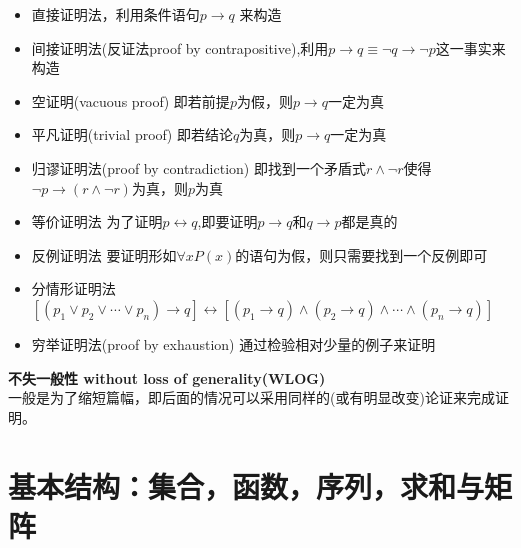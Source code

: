 \documentclass{article}
\begin{document}
    \begin{itemize}
        \item 直接证明法，利用条件语句$p\rightarrow q$ 来构造
        \item 间接证明法(反证法proof by contrapositive),利用$p\rightarrow q \equiv \neg q \rightarrow \neg p$这一事实来构造
        \item 空证明(vacuous proof) 即若前提$p$为假，则$p\rightarrow q$一定为真
        \item 平凡证明(trivial proof) 即若结论$q$为真，则$p\rightarrow q$一定为真
        \item 归谬证明法(proof by contradiction) 即找到一个矛盾式$r\wedge \neg r$使得$\neg p \rightarrow (r \wedge \neg r)$为真，则$p$为真
        \item 等价证明法 为了证明$p\leftrightarrow q$,即要证明$p\rightarrow q$和$q\rightarrow p$都是真的
        \item 反例证明法 要证明形如$\forall xP(x)$的语句为假，则只需要找到一个反例即可
        \item 分情形证明法 $[(p_1 \vee p_2 \vee \cdots \vee p_n)\rightarrow q] \leftrightarrow [(p_1\rightarrow q)\wedge (p_2\rightarrow q)\wedge \cdots \wedge (p_n\rightarrow q)]$
        \item 穷举证明法(proof by exhaustion) 通过检验相对少量的例子来证明
    \end{itemize}

    \textbf{不失一般性 without loss of generality(WLOG)}\\
    一般是为了缩短篇幅，即后面的情况可以采用同样的(或有明显改变)论证来完成证明。

    \section{基本结构：集合，函数，序列，求和与矩阵}
\end{document}
